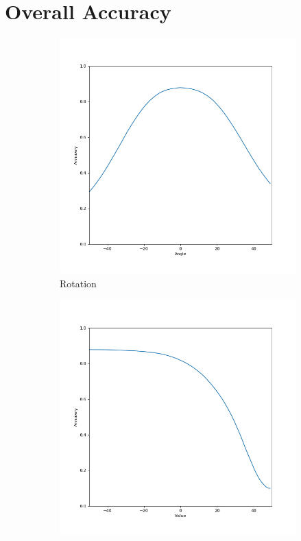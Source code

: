 \section{Overall Accuracy}
\begin{figure}[htb!]
    \centering
    \begin{subfigure}[b]{0.3\textwidth}
        \centering
        \includegraphics[width=\textwidth]{chapters/results/CNN/Rotate/acc.png}
        \caption{Rotation}
        \label{fig:Rotate-misclass0}
    \end{subfigure}
    \begin{subfigure}[b]{ 0.3\textwidth}
        \centering
        \includegraphics[width=\textwidth]{chapters/results/CNN/Shade/acc.png}

\end{subfigure}
\end{figure}
